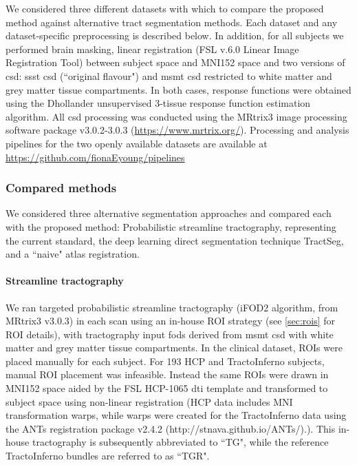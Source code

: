 We considered three different datasets with which to compare the proposed method against alternative tract segmentation methods.
Each dataset and any dataset-specific preprocessing is described below. 
In addition, for all subjects we performed brain masking,\autocite{Tournier2019} linear registration\autocite{Jenkinson2001,Jenkinson2002} (FSL v.6.0 Linear Image Registration Tool) between subject space and MNI152\autocite{Fonov2011} space and two versions of \gls{csd}: \gls{ssst} \gls{csd} (``original flavour")\autocite{Tournier2007,Tournier2019} and \gls{msmt} \gls{csd}\autocite{Jeurissen2014} restricted to white matter and grey matter tissue compartments.
In both cases, response functions were obtained using the Dhollander unsupervised 3-tissue response function estimation algorithm.\autocite{Dhollander2016,Dhollander2019}
All \gls{csd} processing was conducted using the MRtrix3 image processing software package v3.0.2-3.0.3 (\url{https://www.mrtrix.org/}).\autocite{Tournier2019}
Processing and analysis pipelines for the two openly available datasets are available at \url{https://github.com/fionaEyoung/pipelines}

\subsubsection{Compared methods}

We considered three alternative segmentation approaches and compared each with the proposed method: Probabilistic streamline tractography, representing the current standard, the deep learning direct segmentation technique TractSeg, and a ``naive" atlas registration.

\paragraph{Streamline tractography}

We ran targeted probabilistic streamline tractography (iFOD2 algorithm\autocite{Tournier2010}, from MRtrix3\autocite{Tournier2019} v3.0.3) in each scan using an in-house ROI strategy (see \ref{sec:rois} for ROI details), with tractography input \gls{fod}s derived from \gls{msmt} \gls{csd} \autocite{Jeurissen2014} with white matter and grey matter tissue compartments.
In the clinical dataset, ROIs were placed manually for each subject.
For 193 HCP and TractoInferno subjects, manual ROI placement was infeasible.
Instead the same ROIs were drawn in MNI152 space aided by the FSL HCP-1065 \gls{dti} template\autocite{FSLATLAS} and transformed to subject space using non-linear registration (HCP data includes MNI transformation warps, while warps were created for the TractoInferno data using the ANTs registration package v2.4.2 (http://stnava.github.io/ANTs/).\autocite{Tustison2013,Avants2011}).
This in-house tractography is subsequently abbreviated to ``TG", while the reference TractoInferno bundles are referred to as ``TGR".

